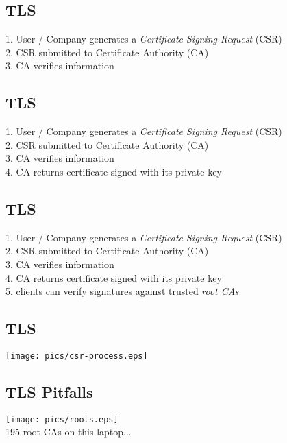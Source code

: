 \documentclass[xga]{xdvislides}
\begin{document}
\subsection{TLS}
1. User / Company generates a {\em Certificate Signing Request} (CSR) \\

2. CSR submitted to Certificate Authority (CA) \\

3. CA verifies information \\

\subsection{TLS}
1. User / Company generates a {\em Certificate Signing Request} (CSR) \\

2. CSR submitted to Certificate Authority (CA) \\

3. CA verifies information \\

4. CA returns certificate signed with its private key \\

\subsection{TLS}
1. User / Company generates a {\em Certificate Signing Request} (CSR) \\

2. CSR submitted to Certificate Authority (CA) \\

3. CA verifies information \\

4. CA returns certificate signed with its private key \\

5. clients can verify signatures against trusted {\em root CAs} \\

\subsection{TLS}
\begin{center}
	\texttt{[image: pics/csr-process.eps]}
\end{center}



\subsection{TLS Pitfalls}
\begin{center}
	\texttt{[image: pics/roots.eps]} \\
	195 root CAs on this laptop...
\end{center}
\end{document}
